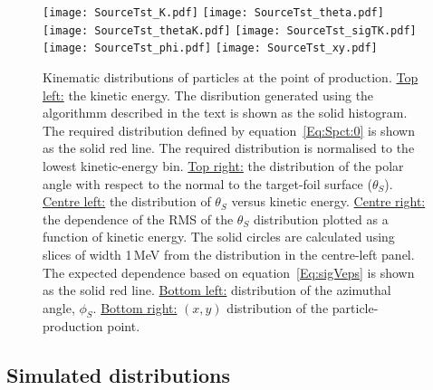 \begin{figure}
  \begin{center}
    \texttt{[image: SourceTst\_K.pdf]}
    \texttt{[image: SourceTst\_theta.pdf]}
    \texttt{[image: SourceTst\_thetaK.pdf]}
    \texttt{[image: SourceTst\_sigTK.pdf]}
    \texttt{[image: SourceTst\_phi.pdf]}
    \texttt{[image: SourceTst\_xy.pdf]}
  \end{center}
  \caption{Kinematic distributions of particles at the point of
    production.
    \underline{Top left:} the kinetic energy.
    The disribution generated using the algorithmm described in the
    text is shown as the solid histogram.
    The required distribution defined by equation~\ref{Eq:Spct:0} is
    shown as the solid red line.
    The required distribution is normalised to the lowest
    kinetic-energy bin.
    \underline{Top right:} the distribution of the polar angle with
    respect to the normal to the target-foil surface ($\theta_S$).
    \underline{Centre left:} the distribution of $\theta_S$ versus
    kinetic energy.
    \underline{Centre right:} the dependence of the RMS of the
    $\theta_S$ distribution plotted as a function of kinetic energy.
    The solid circles are calculated using slices of width 1\,MeV
    from the distribution in the centre-left panel.
    The expected dependence based on equation~\ref{Eq:sigVeps} is
    shown as the solid red line.
    \underline{Bottom left:} distribution of the azimuthal angle,
    $\phi_S$. 
    \underline{Bottom right:} $(x, y)$ distribution of the
    particle-production point.
  }
  \label{Fig:LsrDrvSrc:Dists}
\end{figure}

\subsection{Simulated distributions}

